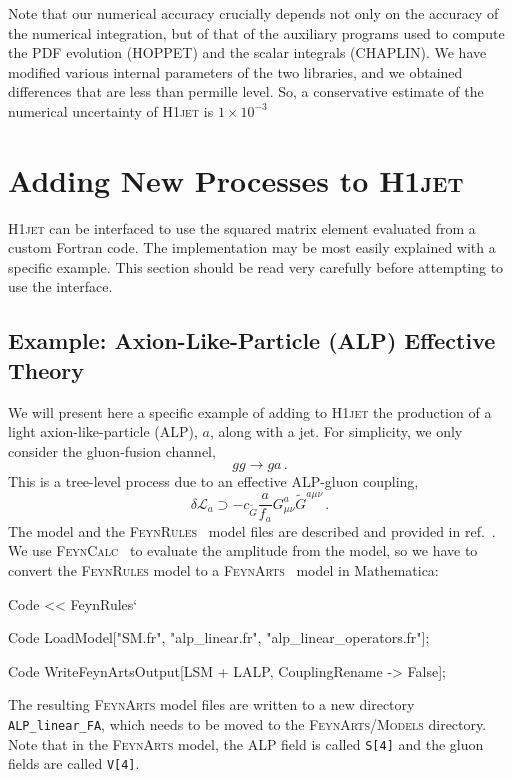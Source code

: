 \documentclass[12pt]{article}
\begin{document}
\newpage 

Note that our numerical accuracy crucially depends not only on the
accuracy of the numerical integration, but of that of the auxiliary
programs used to compute the PDF evolution (\textsc{HOPPET}) and the
scalar integrals (\textsc{CHAPLIN}). We have modified various internal
parameters of the two libraries, and we obtained differences that are
less than permille level. So, a conservative estimate of the numerical
uncertainty of \textsc{H1jet} is $1\times 10^{-3}$

\section{Adding New Processes to \textsc{H1jet}}
\label{sec:newprocs} 
\textsc{H1jet} can be interfaced to use the squared matrix element
evaluated from a custom Fortran code. The implementation may be most
easily explained with a specific example. This section should be read very 
carefully before attempting to use the interface.

\subsection{Example: Axion-Like-Particle (ALP) Effective Theory}
We will present here a specific example of adding to \textsc{H1jet}
the production of a light axion-like-particle (ALP), $a$, along with a
jet. For simplicity, we only consider the gluon-fusion channel,
\begin{equation}
    g g \rightarrow g a \,. 
\end{equation}
This is a tree-level process due to an effective ALP-gluon coupling, 
\begin{equation}
   \delta \mathcal{L}_a \supset -c_{\tilde{G}}\frac{a}{f_a} G_{\mu\nu}^{a} \tilde{G}^{a \mu\nu} \,. \label{eq:ggacoupling}
\end{equation}
The model and the \textsc{FeynRules}~\cite{Alloul:2013bka} model files
are described and provided in ref.~\cite{Brivio:2017ije}. We use
\textsc{FeynCalc}~\cite{Mertig:1990an,Shtabovenko:2016sxi,Shtabovenko:2020gxv}
to evaluate the amplitude from the model, so we have to convert
the \textsc{FeynRules} model to a \textsc{FeynArts}~\cite{Hahn:2000kx}
model in Mathematica:
\begin{mmaCell}{Code}
<< FeynRules` 
\end{mmaCell}
\begin{mmaCell}{Code}
LoadModel["SM.fr", "alp_linear.fr", "alp_linear_operators.fr"];  
\end{mmaCell}
\begin{mmaCell}{Code}
WriteFeynArtsOutput[LSM + LALP, CouplingRename -> False]; 
\end{mmaCell}
The resulting \textsc{FeynArts} model files are written to a new directory \texttt{ALP\_linear\_FA}, which needs to be moved to the \textsc{FeynArts/Models} directory. Note that in the \textsc{FeynArts} model, the ALP field is called \texttt{S[4]} and the gluon fields are called \texttt{V[4]}. 
\end{document}
